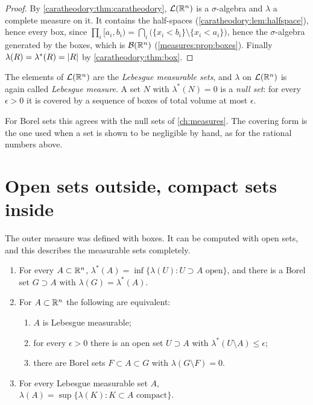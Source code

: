 \begin{notechapter}
\begin{proof}
By \cref{caratheodory:thm:caratheodory}, $\mathcal L(\mathbb{R}^n)$ is a
$\sigma$-algebra and $\lambda$ a complete measure on it. It contains
the half-spaces (\cref{caratheodory:lem:halfspace}), hence every box,
since
$\prod_i[a_i, b_i)
= \bigcap_i\bigl(\{x_i < b_i\}\setminus\{x_i < a_i\}\bigr)$, hence
the $\sigma$-algebra generated by the boxes, which is
$\mathcal B(\mathbb{R}^n)$ (\cref{measures:prop:boxes}). Finally
$\lambda(R) = \lambda^*(R) = \left|R\right|$ by \cref{caratheodory:thm:box}.
\end{proof}

\begin{definition}\label{caratheodory:def:lebesgue}
The elements of $\mathcal L(\mathbb{R}^n)$ are the \emph{Lebesgue measurable
sets}, and $\lambda$ on $\mathcal L(\mathbb{R}^n)$ is again called
\emph{Lebesgue measure}. A set $N$ with $\lambda^*(N) = 0$ is a
\emph{null set}: for every $\epsilon > 0$ it is covered by a sequence
of boxes of total volume at most $\epsilon$.
\end{definition}

For Borel sets this agrees with the null sets of \cref{ch:measures}.
The covering form is the one used when a set is shown to be negligible
by hand, as for the rational numbers above.

\section{Open sets outside, compact sets inside}
\label{caratheodory:sec:regularity}

The outer measure was defined with boxes. It can be computed with open
sets, and this describes the measurable sets completely.

\begin{theorem}[Regularity]\label{caratheodory:thm:regularity}
\begin{enumerate}[nosep]
  \item For every $A\subset\mathbb{R}^n$,
        $\lambda^*(A) = \inf\{\lambda(U) : U\supset A\text{ open}\}$,
        and there is a Borel set $G\supset A$ with
        $\lambda(G) = \lambda^*(A)$.
  \item For $A\subset\mathbb{R}^n$ the following are equivalent:
        \begin{enumerate}[nosep]
          \item $A$ is Lebesgue measurable;
          \item for every $\epsilon > 0$ there is an open set
                $U\supset A$ with $\lambda^*(U\setminus A)\leq\epsilon$;
          \item there are Borel sets $F\subset A\subset G$ with
                $\lambda(G\setminus F) = 0$.
        \end{enumerate}
  \item For every Lebesgue measurable set $A$,
        $\lambda(A) = \sup\{\lambda(K) : K\subset A\text{ compact}\}$.
\end{enumerate}
\end{theorem}


\end{notechapter}
